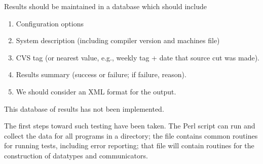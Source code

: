\documentclass{article}
\begin{document}
Results should be maintained in a database which should include
\begin{enumerate}
\item Configuration options
\item System description (including compiler version and machines file)
\item CVS tag (or nearest value, e.g., weekly tag + date that source
cut was made).
\item Results summary (success or failure; if failure, reason).
\item We should consider an XML format for the output.
\end{enumerate}
This database of results has not been implemented.

The first steps toward such testing have been taken.  The Perl script
 can run and collect the data for all programs in a
directory; the file  contains common routines for
running tests, including error reporting; that file will contain routines for
the construction of datatypes and communicators. 
\end{document}
